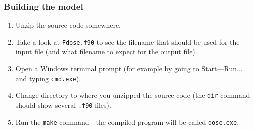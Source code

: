 \documentclass[10pt,a4paper]{article}
\newcommand{\bslash}{\symbol{92}}
\begin{document}
\subsubsection*{Building the model}

\begin{enumerate}

\item Unzip the source code somewhere.

\item Take a look at \texttt{F{\bslash}dose.f90} to see the filename that should be used for the 
input file (and what filename to expect for the output file).

\item Open a Windows terminal prompt (for example by going to Start---Run... and typing 
\texttt{cmd.exe}).

\item Change directory to where you unzipped the source code (the \texttt{dir} command should show 
several \texttt{.f90} files).

\item Run the \texttt{make} command - the compiled program will be called \texttt{dose.exe}.

\end{enumerate}



\end{document}
